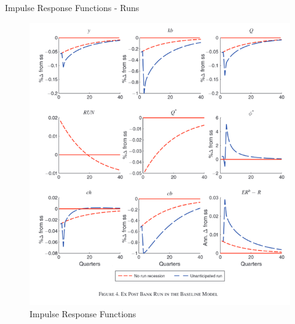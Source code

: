 \documentclass[
	11pt, %
	aspectratio=169, %
]{beamer}
\begin{document}
\begin{frame}{Impulse Response Functions - Runs}
    \begin{figure}
        \centering
        \includegraphics[scale=0.35]{run_case.png}
        \caption{Impulse Response Functions}
        \label{fig:irf_run}
    \end{figure}
\end{frame}
\end{document}

